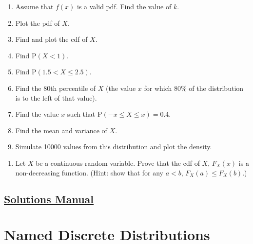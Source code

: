 \documentclass[
  letterpaper,
  DIV=11,
  numbers=noendperiod]{scrreprt}
\providecommand{\tightlist}{%
  \setlength{\itemsep}{0pt}\setlength{\parskip}{0pt}}\usepackage{longtable,booktabs,array}
\begin{document}
\begin{enumerate}
\def\labelenumi{\alph{enumi}.}
\tightlist
\item
  Assume that \(f(x)\) is a valid pdf. Find the value of \(k\).\\
\item
  Plot the pdf of \(X\).\\
\item
  Find and plot the cdf of \(X\).\\
\item
  Find \(\mbox{P}(X<1)\).\\
\item
  Find \(\mbox{P}(1.5<X\leq 2.5)\).\\
\item
  Find the 80th percentile of \(X\) (the value \(x\) for which 80\% of
  the distribution is to the left of that value).\\
\item
  Find the value \(x\) such that \(\mbox{P}(-x \leq X \leq x)=0.4\).\\
\item
  Find the mean and variance of \(X\).\\
\item
  Simulate 10000 values from this distribution and plot the density.
\end{enumerate}

\begin{enumerate}
\def\labelenumi{\arabic{enumi}.}
\setcounter{enumi}{1}
\tightlist
\item
  Let \(X\) be a continuous random variable. Prove that the cdf of
  \(X\), \(F_X(x)\) is a non-decreasing function. (Hint: show that for
  any \(a < b\), \(F_X(a) \leq F_X(b)\).)
\end{enumerate}

\section*{\texorpdfstring{\href{https://ds-usafa.github.io/CPS-Solutions-Manual/CONRANDVAR.html}{Solutions
Manual}}{Solutions Manual}}\label{solutions-manual-11}


\chapter{Named Discrete Distributions}\label{DISCRETENAMED}
\end{document}
